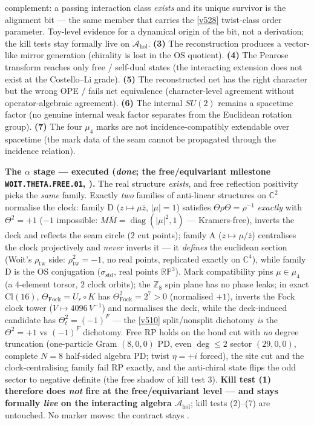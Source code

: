 \documentclass[11pt,a4paper]{article}
\newcommand{\Z}{\mathbb Z}
\begin{document}
complement: a passing interaction class \emph{exists} and its unique survivor is the alignment
bit --- the same member that carries the \vref{v528} twist-class order parameter. Toy-level
evidence for a dynamical origin of the bit, not a derivation; the kill tests stay formally live
on $\mathcal A_{\mathrm{hol}}$.
\textbf{(3)} The reconstruction produces a vector-like mirror generation (chirality is lost in the
OS quotient).
\textbf{(4)} The Penrose transform reaches only free / self-dual states (the interacting extension
does not exist at the Costello--Li grade).
\textbf{(5)} The reconstructed net has the right character but the wrong OPE / fails net equivalence
(character-level agreement without operator-algebraic agreement).
\textbf{(6)} The internal $SU(2)$ remains a spacetime factor (no genuine internal weak factor
separates from the Euclidean rotation group).
\textbf{(7)} The four $\mu_4$ marks are not incidence-compatibly extendable over spacetime (the
mark data of the seam cannot be propagated through the incidence relation).

\par\smallskip\noindent\textbf{The $\alpha$ stage --- executed (\emph{done}; the free/equivariant
milestone \texttt{WOIT.THETA.FREE.01}, ).} The real structure
\emph{exists}, and free reflection positivity picks the \emph{same} family. Exactly \emph{two}
families of anti-linear structures on $\mathbb C^2$ normalise the clock: family D
($z\mapsto\mu\bar z$, $|\mu|=1$) satisfies $\Theta\rho\Theta=\rho^{-1}$ \emph{exactly} with
$\Theta^2=+1$ ($-1$ impossible: $M\bar M=\operatorname{diag}(|\mu|^2,1)$ --- Kramers-free), inverts
the deck and reflects the seam circle ($2$ cut points); family A ($z\mapsto\mu/\bar z$) centralises
the clock projectively and \emph{never} inverts it --- it \emph{defines} the euclidean section
(Woit's $\rho_{\mathrm{tw}}$ side: $\rho_{\mathrm{tw}}^2=-1$, no real points, replicated exactly on
$\mathbb C^4$), while family D is the OS conjugation ($\sigma_{\mathrm{std}}$, real points
$\mathbb{RP}^3$). Mark compatibility pins $\mu\in\mu_4$ (a $4$-element torsor, $2$ clock orbits);
the $\Z_8$ spin plane has no phase leaks; in exact $\mathrm{Cl}(16)$,
$\Theta_{\mathrm{Fock}}=U_r\circ K$ has $\Theta_{\mathrm{Fock}}^2=2^7>0$ (normalised $+1$), inverts
the Fock clock tower ($V\mapsto 4096\,V^{-1}$) and normalises the deck, while the deck-induced
candidate has $\Theta_t^2=(-1)^F$ --- the \vref{v510} split/nonsplit dichotomy \emph{is} the
$\Theta^2=+1$ vs $(-1)^F$ dichotomy. Free RP holds on the bond cut with \emph{no} degree truncation
(one-particle Gram $(8,0,0)$ PD, even $\deg\le2$ sector $(29,0,0)$, complete $N=8$ half-sided
algebra PD; twist $\eta=+i$ forced), the site cut and the clock-centralising family fail RP
exactly, and the anti-chiral state flips the odd sector to negative definite (the free shadow of
kill test 3). \textbf{Kill test (1) therefore does \emph{not} fire at the free/equivariant level
--- and stays formally \emph{live} on the interacting algebra $\mathcal A_{\mathrm{hol}}$}; kill
tests (2)--(7) are untouched. No marker moves: the contract stays \mO.
\end{document}
